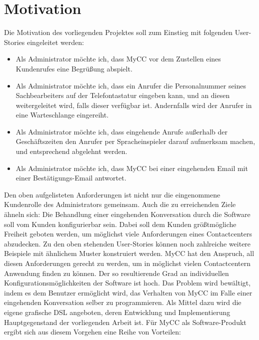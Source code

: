 \section{Motivation}
\label{sec:Motivation}
Die Motivation des vorliegenden Projektes soll zum Einstieg mit folgenden User-Stories eingeleitet werden:
\begin{itemize}
\item Als Administrator möchte ich, dass MyCC vor dem Zustellen eines Kundenrufes eine Begrüßung abspielt.
\item Als Administrator möchte ich, dass ein Anrufer die Personalnummer seines Sachbearbeiters auf der Telefontastatur eingeben kann, und an diesen weitergeleitet wird, falls dieser verfügbar ist. Andernfalls wird der Anrufer in eine Warteschlange eingereiht. 
\item Als Administrator möchte ich, dass eingehende Anrufe außerhalb der Ge\-schäftszeiten den Anrufer per Spracheinspieler darauf aufmerksam machen, und entsprechend abgelehnt werden.
\item Als Administrator möchte ich, dass MyCC bei einer eingehenden Email mit einer Bestätigungs-Email antwortet.
\end{itemize}
Den oben aufgelisteten Anforderungen ist nicht nur die eingenommene Kundenrolle des Administrators gemeinsam. Auch die zu erreichenden Ziele ähneln sich: Die Behandlung einer eingehenden Konversation durch die Software soll vom Kunden konfigurierbar sein. Dabei soll dem Kunden größtmögliche Freiheit geboten werden, um möglichst viele Anforderungen eines Contactcenters abzudecken. Zu den oben stehenden User-Stories können noch zahlreiche weitere Beispiele mit ähnlichem Muster konstruiert werden. MyCC hat den Anspruch, all diesen Anforderungen gerecht zu werden, um in möglichst vielen Contactcentern Anwendung finden zu können. Der so resultierende Grad an individuellen Konfigurationsmöglichkeiten der Software ist hoch. Das Problem wird bewältigt, indem es dem Benutzer ermöglicht wird, das Verhalten von MyCC im Falle einer eingehenden Konversation selber zu programmieren. Als Mittel dazu wird die eigene grafische DSL angeboten, deren Entwicklung und Implementierung Hauptgegenstand der vorliegenden Arbeit ist.
\newline
Für MyCC als Software-Produkt ergibt sich aus diesem Vorgehen eine Reihe von Vorteilen:


